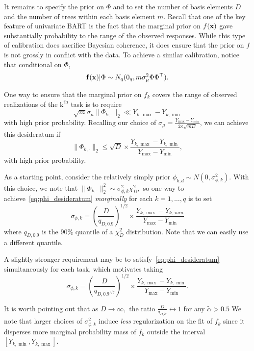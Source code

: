 \documentclass[12pt]{article}
\begin{document}
It remains to specify the prior on $\Phi$ and to set the number of basis elements $D$ and the number of trees within each basis element $m.$
Recall that one of the key feature of univariate BART is the fact that the marginal prior on $f(\mathbf{x})$ gave substantially probability to the range of the observed responses.
While this type of calibration does sacrifice Bayesian coherence, it does ensure that the prior on $f$ is not grossly in conflict with the data.
To achieve a similar calibration, notice that conditional on $\Phi$, 
$$
\mathbf{f}(\mathbf{x}) | \Phi \sim N_{q}(0_{q}, m\sigma^{2}_{\mu}\Phi\Phi^{\top}).
$$

One way to ensure that the marginal prior on $f_{k}$ covers the range of observed realizations of the $\text{k}^{\text{th}}$ task is to require 
$$
\sqrt{m}\sigma_{\mu}\lVert \Phi_{k,\cdot}\rVert_{2} \ll Y_{k,\max} - Y_{k,\min}
$$
with high prior probability.
Recalling our choice of $\sigma_{\mu} = \frac{Y_{\max} - Y_{\min}}{2\kappa \sqrt{mD}}$, we can achieve this desideratum if 
\begin{equation}
\label{eq:phi_desideratum}
\lVert \Phi_{k,\cdot} \rVert_{2} \leq \sqrt{D} \times \frac{Y_{k,\max} - Y_{k,\min}}{Y_{\max} - Y_{\min}},
\end{equation}
with high prior probability.


As a starting point, consider the relatively simply prior $\phi_{k,d} \sim N(0, \sigma^{2}_{\phi,k}).$
With this choice, we note that $\lVert \Phi_{k,\cdot} \rVert_{2}^{2} \sim \sigma^{2}_{\phi,k}\chi^{2}_{D},$ so one way to achieve~\eqref{eq:phi_desideratum} \textit{marginally} for each $k = 1, \ldots, q$ is to set
$$
\sigma_{\phi,k} = \left(\frac{D}{q_{D,0.9}}\right)^{1/2} \times \frac{Y_{k,\max} - Y_{k,\,min}}{Y_{\max} - Y_{\min}}
$$
where $q_{D,0.9}$ is the 90\% quantile of a $\chi^{2}_{D}$ distribution.
Note that we can easily use a different quantile.

A slightly stronger requirement may be to satisfy~\eqref{eq:phi_desideratum} simultaneously for each task, which motivates taking
$$
\sigma_{\phi,k} = \left(\frac{D}{q_{D,0.9^{1/q}}}\right)^{1/2}\times \frac{Y_{k,\max} - Y_{k,\min}}{Y_{\max} - Y_{\min}}.
$$

It is worth pointing out that as $D \rightarrow \infty,$ the ratio $\frac{D}{q_{D,\tilde{\alpha}}} \leftrightarrow 1$ for any $\tilde{\alpha} > 0.5$
We note that larger choices of $\sigma^{2}_{\phi,k}$ induce \textit{less} regularization on the fit of $f_{k}$ since it disperses more marginal probability mass of $f_{k}$ outside the interval $[Y_{k,\min}, Y_{k,\max}].$
\end{document}
